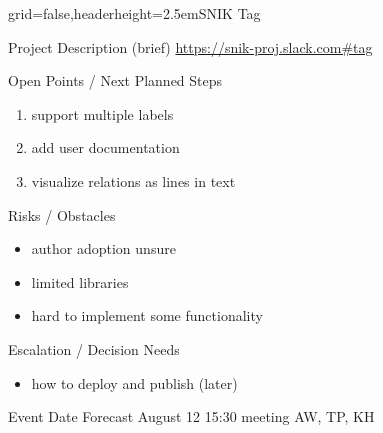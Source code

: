 \documentclass[english]{kiesgrube}
\begin{document}
\begin{poster}{grid=false,headerheight=2.5em}{}{SNIK Tag}{}{}
\begin{posterbox}[name=description,column=1,row=0]{Project Description (brief)}
\url{https://snik-proj.slack.com#tag}
\end{posterbox}
\begin{posterbox}[name=open,column=1,below=description]{Open Points / Next Planned Steps}
\begin{enumerate}
\item support multiple labels
\item add user documentation
\item visualize relations as lines in text
\end{enumerate}
\end{posterbox}
\begin{posterbox}[name=risks,column=1,below=open]{Risks / Obstacles}
\begin{itemize}
\item author adoption unsure
\item limited libraries
\item hard to implement some functionality 
\end{itemize}
\end{posterbox}
\begin{posterbox}[name=escalation,column=1,below=risks]{Escalation / Decision Needs}
\begin{itemize}
\item how to deploy and publish (later)
\end{itemize}
\end{posterbox}
\begin{posterbox}[name=event,below=progress,]{Event Date Forecast}
August 12 15:30 meeting AW, TP, KH
\end{posterbox}
\footer{}
\end{poster}
\end{document}
